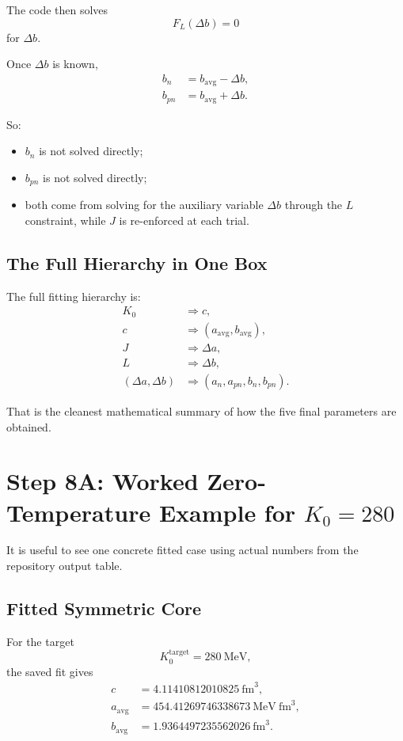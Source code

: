 \documentclass[11pt]{article}
\begin{document}
The code then solves
\begin{equation}
F_L(\Delta b)=0
\end{equation}
for $\Delta b$.

Once $\Delta b$ is known,
\begin{align}
b_n &= b_{\mathrm{avg}}-\Delta b, \\
b_{pn} &= b_{\mathrm{avg}}+\Delta b.
\end{align}

So:
\begin{itemize}
\item $b_n$ is not solved directly;
\item $b_{pn}$ is not solved directly;
\item both come from solving for the auxiliary variable $\Delta b$ through the
$L$ constraint, while $J$ is re-enforced at each trial.
\end{itemize}

\subsection{The Full Hierarchy in One Box}

The full fitting hierarchy is:
\begin{align}
K_0 &\Longrightarrow c, \\
c &\Longrightarrow (a_{\mathrm{avg}}, b_{\mathrm{avg}}), \\
J &\Longrightarrow \Delta a, \\
L &\Longrightarrow \Delta b, \\
(\Delta a,\Delta b)
&\Longrightarrow
(a_n,a_{pn},b_n,b_{pn}).
\end{align}

That is the cleanest mathematical summary of how the five final parameters are
obtained.

\section{Step 8A: Worked Zero-Temperature Example for \texorpdfstring{$K_0=280$}{K0=280}}

It is useful to see one concrete fitted case using actual numbers from the
repository output table.

\subsection{Fitted Symmetric Core}

For the target
\[
K_0^{\mathrm{target}}=280\ \mathrm{MeV},
\]
the saved fit gives
\begin{align}
c &= 4.11410812010825\ \mathrm{fm}^3, \\
a_{\mathrm{avg}} &= 454.41269746338673\ \mathrm{MeV\ fm}^3, \\
b_{\mathrm{avg}} &= 1.9364497235562026\ \mathrm{fm}^3.
\end{align}
\end{document}
